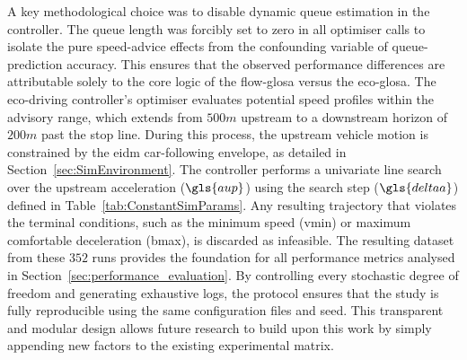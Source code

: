 A key methodological choice was to disable dynamic queue estimation in the controller. The queue length was forcibly set to zero in all optimiser calls to isolate the pure speed-advice effects from the confounding variable of queue-prediction accuracy. This ensures that the observed performance differences are attributable solely to the core logic of the \ac{flow-glosa} versus the \ac{eco-glosa}.
\mynewline
The eco-driving controller's optimiser evaluates potential speed profiles within the advisory range, which extends from $500\unit{m}$ upstream to a downstream horizon of $200\unit{m}$ past the stop line. During this process, the upstream vehicle motion is constrained by the \ac{eidm} car-following envelope, as detailed in Section~\ref{sec:SimEnvironment}. The controller performs a univariate line search over the upstream acceleration ($\gls{aup}$) using the search step ($\gls{deltaa}$) defined in Table~\ref{tab:ConstantSimParams}. Any resulting trajectory that violates the terminal conditions, such as the minimum speed (\gls{vmin}) or maximum comfortable deceleration (\gls{bmax}), is discarded as infeasible.
\mynewline
The resulting dataset from these $352$ runs provides the foundation for all performance metrics analysed in Section~\ref{sec:performance_evaluation}. By controlling every stochastic degree of freedom and generating exhaustive logs, the protocol ensures that the study is fully reproducible using the same configuration files and seed. This transparent and modular design allows future research to build upon this work by simply appending new factors to the existing experimental matrix.